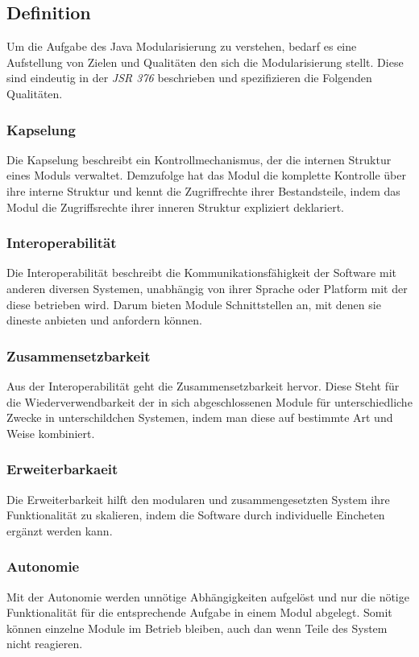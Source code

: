 \subsection{Definition}
  Um die Aufgabe des Java Modularisierung zu verstehen, bedarf es eine Aufstellung von Zielen und Qualitäten den sich die Modularisierung stellt. Diese sind eindeutig in der \textit{JSR 376} beschrieben und spezifizieren die Folgenden Qualitäten.

\subsubsection{Kapselung}
  Die Kapselung beschreibt ein Kontrollmechanismus, der die internen Struktur eines Moduls verwaltet.
  Demzufolge hat das Modul die komplette Kontrolle über ihre interne Struktur und kennt die Zugriffrechte ihrer Bestandsteile, indem das Modul die Zugriffsrechte ihrer inneren Struktur expliziert deklariert.

\subsubsection{Interoperabilität}
  Die Interoperabilität beschreibt die Kommunikationsfähigkeit der Software mit anderen diversen Systemen, unabhängig von ihrer Sprache oder Platform mit der diese betrieben wird. 
  Darum bieten Module Schnittstellen an, mit denen sie dineste anbieten und anfordern können.

\subsubsection{Zusammensetzbarkeit}
  Aus der Interoperabilität geht die Zusammensetzbarkeit hervor.
  Diese Steht für die Wiederverwendbarkeit der in sich abgeschlossenen Module für unterschiedliche Zwecke in unterschildchen Systemen, indem man diese auf bestimmte Art und Weise kombiniert. 

\subsubsection{Erweiterbarkaeit}
 Die Erweiterbarkeit hilft den modularen und zusammengesetzten System ihre Funktionalität zu skalieren, indem die Software durch individuelle Eincheten ergänzt werden kann. 

\subsubsection{Autonomie}
  Mit der Autonomie werden unnötige Abhängigkeiten aufgelöst und nur die nötige Funktionalität für die entsprechende Aufgabe in einem Modul abgelegt. 
  Somit können einzelne Module im Betrieb bleiben, auch dan wenn Teile des System nicht reagieren. 

